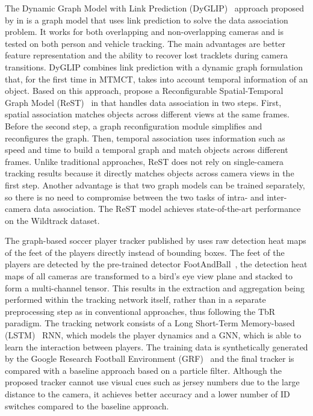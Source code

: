 The Dynamic Graph Model with Link Prediction (DyGLIP)~\cite{Quach21} approach proposed by \citeauthor{Quach21} in \citeyear{Quach21} is a graph model that uses link prediction to solve the data association problem. It works for both overlapping and non-overlapping cameras and is tested on both person and vehicle tracking. The main advantages are better feature representation and the ability to recover lost tracklets during camera transitions. DyGLIP combines link prediction with a dynamic graph formulation that, for the first time in MTMCT, takes into account temporal information of an object. Based on this approach, \citeauthor{Cheng23} propose a Reconfigurable Spatial-Temporal Graph Model (ReST)~\cite{Cheng23} in \citeyear{Cheng23} that handles data association in two steps. First, spatial association matches objects across different views at the same frames. Before the second step, a graph reconfiguration module simplifies and reconfigures the graph. Then, temporal association uses information such as speed and time to build a temporal graph and match objects across different frames. Unlike traditional approaches, ReST does not rely on single-camera tracking results because it directly matches objects across camera views in the first step. Another advantage is that two graph models can be trained separately, so there is no need to compromise between the two tasks of intra- and inter-camera data association. The ReST model achieves state-of-the-art performance on the Wildtrack dataset.

The graph-based soccer player tracker published by \textcite{Komorowski22} uses raw detection heat maps of the feet of the players directly instead of bounding boxes. The feet of the players are detected by the pre-trained detector FootAndBall~\cite{Komorowski19}, the detection heat maps of all cameras are transformed to a bird's eye view plane and stacked to form a multi-channel tensor. This results in the extraction and aggregation being performed within the tracking network itself, rather than in a separate preprocessing step as in conventional approaches, thus following the TbR paradigm. The tracking network consists of a Long Short-Term Memory-based (LSTM)~\cite{Gers02} RNN, which models the player dynamics and a GNN, which is able to learn the interaction between players. The training data is synthetically generated by the Google Research Football Environment (GRF)~\cite{Kurach19} and the final tracker is compared with a baseline approach based on a particle filter. Although the proposed tracker cannot use visual cues such as jersey numbers due to the large distance to the camera, it achieves better accuracy and a lower number of ID switches compared to the baseline approach.

